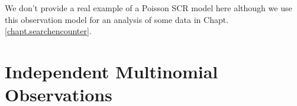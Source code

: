 We don't provide a real example of a Poisson SCR model here although we use this observation
model for an analysis of some data in Chapt. 
 \ref{chapt.searchencounter}.

\section{Independent Multinomial Observations}

